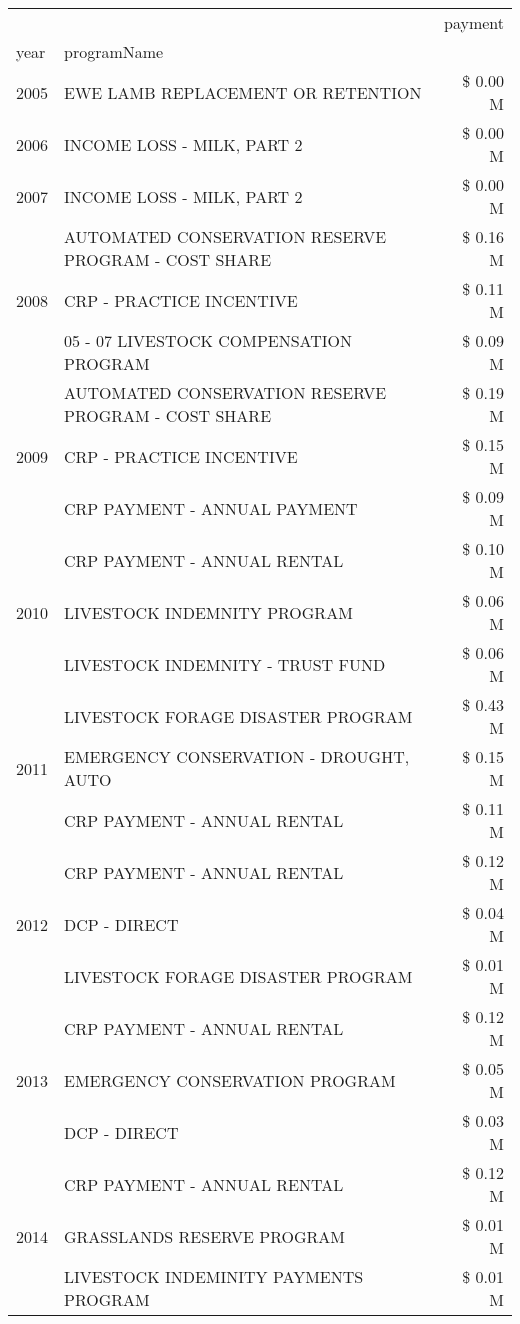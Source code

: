 \begin{tabular}{llr}
\toprule
 &  & payment \\
year & programName &  \\
\midrule
2005 & EWE LAMB REPLACEMENT OR RETENTION & \$ 0.00 M \\
\cline{1-3}
2006 & INCOME LOSS - MILK, PART 2 & \$ 0.00 M \\
\cline{1-3}
2007 & INCOME LOSS - MILK, PART 2 & \$ 0.00 M \\
\cline{1-3}
\multirow[t]{3}{*}{2008} & AUTOMATED CONSERVATION RESERVE PROGRAM - COST SHARE & \$ 0.16 M \\
 & CRP - PRACTICE INCENTIVE & \$ 0.11 M \\
 & 05 - 07 LIVESTOCK COMPENSATION PROGRAM & \$ 0.09 M \\
\cline{1-3}
\multirow[t]{3}{*}{2009} & AUTOMATED CONSERVATION RESERVE PROGRAM - COST SHARE & \$ 0.19 M \\
 & CRP - PRACTICE INCENTIVE & \$ 0.15 M \\
 & CRP PAYMENT - ANNUAL PAYMENT & \$ 0.09 M \\
\cline{1-3}
\multirow[t]{3}{*}{2010} & CRP PAYMENT - ANNUAL RENTAL & \$ 0.10 M \\
 & LIVESTOCK INDEMNITY PROGRAM & \$ 0.06 M \\
 & LIVESTOCK INDEMNITY - TRUST FUND & \$ 0.06 M \\
\cline{1-3}
\multirow[t]{3}{*}{2011} & LIVESTOCK FORAGE DISASTER PROGRAM & \$ 0.43 M \\
 & EMERGENCY CONSERVATION - DROUGHT, AUTO & \$ 0.15 M \\
 & CRP PAYMENT - ANNUAL RENTAL & \$ 0.11 M \\
\cline{1-3}
\multirow[t]{3}{*}{2012} & CRP PAYMENT - ANNUAL RENTAL & \$ 0.12 M \\
 & DCP - DIRECT & \$ 0.04 M \\
 & LIVESTOCK FORAGE DISASTER PROGRAM & \$ 0.01 M \\
\cline{1-3}
\multirow[t]{3}{*}{2013} & CRP PAYMENT - ANNUAL RENTAL & \$ 0.12 M \\
 & EMERGENCY CONSERVATION PROGRAM & \$ 0.05 M \\
 & DCP - DIRECT & \$ 0.03 M \\
\cline{1-3}
\multirow[t]{3}{*}{2014} & CRP PAYMENT - ANNUAL RENTAL & \$ 0.12 M \\
 & GRASSLANDS RESERVE PROGRAM & \$ 0.01 M \\
 & LIVESTOCK INDEMINITY PAYMENTS PROGRAM & \$ 0.01 M \\

\end{tabular}
